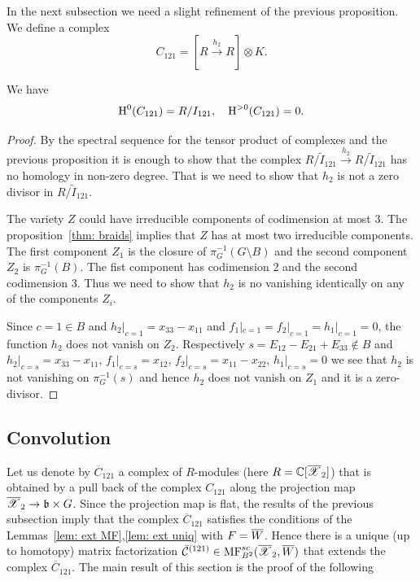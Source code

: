 In the next subsection we need a slight refinement of the previous proposition. We define a complex
$$ C_{121}=[R\overset{h_2}{\longrightarrow} R]\otimes K.$$

\begin{proposition}We have
$$\textup{H}^0(C_{121})=R/I_{121},\quad \textup{H}^{>0}(C_{121})=0.$$
\end{proposition}
\begin{proof}
By the spectral sequence for the tensor product of complexes and the previous proposition it is enough to
show that the complex $R/\tilde{I}_{121}\xrightarrow{h_2} R/\tilde{I}_{121}$ has no homology in non-zero degree.
That is we need to show that $h_2$ is not a zero divisor in $R/\tilde{I}_{121}$.

The variety $Z$ could have irreducible components of codimension at most $3$.
The proposition~\ref{thm: braids} implies that $Z$ has at most two irreducible components. The first component $Z_1$ is the closure
of $\pi_G^{-1}(G\setminus B)$ and the second component $Z_2$ is $\pi^{-1}_G(B)$. The fist component has codimension $2$ and
the second codimension $3$. Thus we need to show that $h_2$ is no vanishing identically on any of the components $Z_i$.

Since $c=1\in B$ and $h_2|_{c=1}=x_{33}-x_{11}$ and $f_1|_{c=1}=f_2|_{c=1}=h_1|_{c=1}=0$, the function $h_2$ does not vanish on $Z_2$.
Respectively $s=E_{12}-E_{21}+E_{33}\notin B$ and $h_2|_{c=s}=x_{33}-x_{11}$, $f_1|_{c=s}=x_{12}$, $f_2|_{c=s}=x_{11}-x_{22}$, $h_1|_{c=s}=0$ we see that
$h_2$ is not vanishing on $\pi_G^{-1}(s)$ and hence $h_2$ does not vanish on $Z_1$ and it is a zero-divisor.
\end{proof}




\subsection{Convolution} Let us denote by $\overline{C}_{121}$  a complex of $R$-modules (here $R=\mathbb{C}[\overline{\mathscr{X}}_2]$) that is obtained by a pull back of the complex  $C_{121}$ along the
projection map $\overline{\mathscr{X}}_2\to \mathfrak{b}\times G$. Since the projection map is flat,
the results of the previous subsection imply that  the complex $\overline{C}_{121}$ satisfies the conditions of the Lemmas~\ref{lem: ext MF},\ref{lem: ext uniq} with $F=\overline{W}$. Hence there is
a unique (up to homotopy) matrix factorization $\bar{\mathcal{C}}^{(121)}\in \mathrm{MF}^{sc}_{B^2}(\overline{\mathscr{X}}_2,\overline{W})$ that extends the complex $\overline{C}_{121}$. The main result of this section is the proof
of the following

